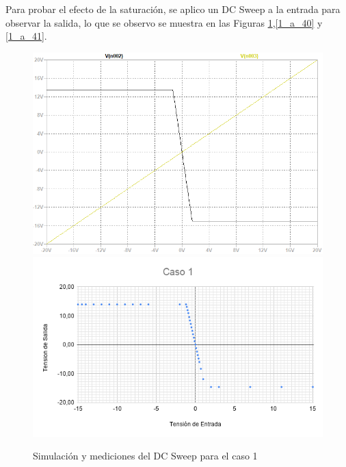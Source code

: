 Para probar el efecto de la saturación, se aplico un DC Sweep a la
entrada para observar la salida, lo que se observo se muestra en las
Figuras \ref{1_a_39},\ref{1_a_40} y \ref{1_a_41}.

\begin{figure}[H]
\begin{centering}
\includegraphics[scale=0.4]{../Ex1/iA/Resources1a/dcswp1sim}\includegraphics[scale=0.4]{../Ex1/iA/Resources1a/DCSWEEP1MED}
\par\end{centering}
\caption{Simulación y mediciones del DC Sweep para el caso 1}
\label{1_a_39}

\end{figure}

